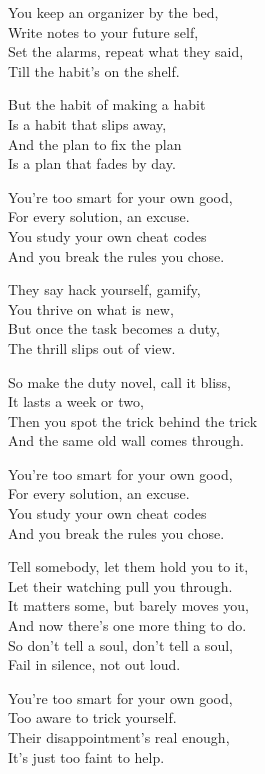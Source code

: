 \begin{lyrics}
You keep an organizer by the bed,\\
Write notes to your future self,\\
Set the alarms, repeat what they said,\\
Till the habit's on the shelf.

But the habit of making a habit\\
Is a habit that slips away,\\
And the plan to fix the plan\\
Is a plan that fades by day.

You're too smart for your own good,\\
For every solution, an excuse.\\
You study your own cheat codes\\
And you break the rules you chose.

They say hack yourself, gamify,\\
You thrive on what is new,\\
But once the task becomes a duty,\\
The thrill slips out of view.

So make the duty novel, call it bliss,\\
It lasts a week or two,\\
Then you spot the trick behind the trick\\
And the same old wall comes through.

You're too smart for your own good,\\
For every solution, an excuse.\\
You study your own cheat codes\\
And you break the rules you chose.

Tell somebody, let them hold you to it,\\
Let their watching pull you through.\\
It matters some, but barely moves you,\\
And now there’s one more thing to do.\\
So don’t tell a soul, don’t tell a soul,\\
Fail in silence, not out loud.

You’re too smart for your own good,\\
Too aware to trick yourself.\\
Their disappointment’s real enough,\\
It’s just too faint to help.
\end{lyrics}

